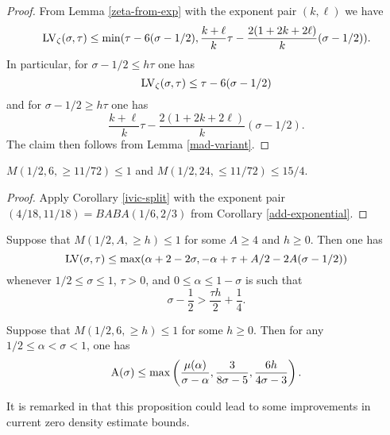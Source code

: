 \begin{proof} From Lemma \ref{zeta-from-exp} with the exponent pair $(k,\ell)$ we have
$$ \mathrm{LV}_\zeta(\sigma,\tau) \leq \min( \tau - 6(\sigma-1/2), \frac{k+\ell}{k}\tau - \frac{2(1+2k+2\ell)}{k} (\sigma-1/2) ).$$
In particular, for $\sigma-1/2 \leq h\tau$ one has
$$ \mathrm{LV}_\zeta(\sigma,\tau) \leq \tau - 6(\sigma-1/2)$$
and for $\sigma-1/2 \geq h\tau$ one has
$$ \frac{k+\ell}{k}\tau - \frac{2(1+2k+2\ell)}{k} (\sigma-1/2).$$
The claim then follows from Lemma \ref{mad-variant}.
\end{proof}


\begin{corollary}\label{ivic-6-large}\cite[(8.56)]{ivic} $M(1/2, 6, \geq 11/72) \leq 1$ and $M(1/2,24, \leq 11/72) \leq 15/4$.
\end{corollary}

\begin{proof} Apply Corollary \ref{ivic-split} with the exponent pair $(4/18, 11/18) = BABA(1/6, 2/3)$ from Corollary \ref{add-exponential}.
\end{proof}

\begin{lemma}\label{bourgain-remark-1}\cite[Proposition 2]{bourgain_remarks_1995} Suppose that $M(1/2,A,\geq h) \leq 1$ for some $A \geq 4$ and $h \geq 0$.  Then one has
    $$ \mathrm{LV}(\sigma,\tau) \leq \max( \alpha + 2 - 2 \sigma, -\alpha + \tau + A/2 - 2A (\sigma-1/2))$$
whenever $1/2 \leq \sigma \leq 1$, $\tau > 0$, and $0 \leq \alpha \leq 1-\sigma$ is such that
$$ \sigma - \frac{1}{2} > \frac{\tau h}{2} + \frac{1}{4}.$$
\end{lemma}

\begin{lemma}\label{bourgain-remark-2}\cite[Proposition 5]{bourgain_remarks_1995}  Suppose that $M(1/2,6,\geq h) \leq 1$ for some $h \geq 0$.  Then for any $1/2 \leq \alpha < \sigma < 1$, one has
$$ \mathrm{A}(\sigma) \leq \max\left( \frac{\mu(\alpha)}{\sigma-\alpha}, \frac{3}{8\sigma-5}, \frac{6h}{4\sigma-3}\right).$$
\end{lemma}

It is remarked in \cite{bourgain_remarks_1995} that this proposition could lead to some improvements in current zero density estimate bounds.

